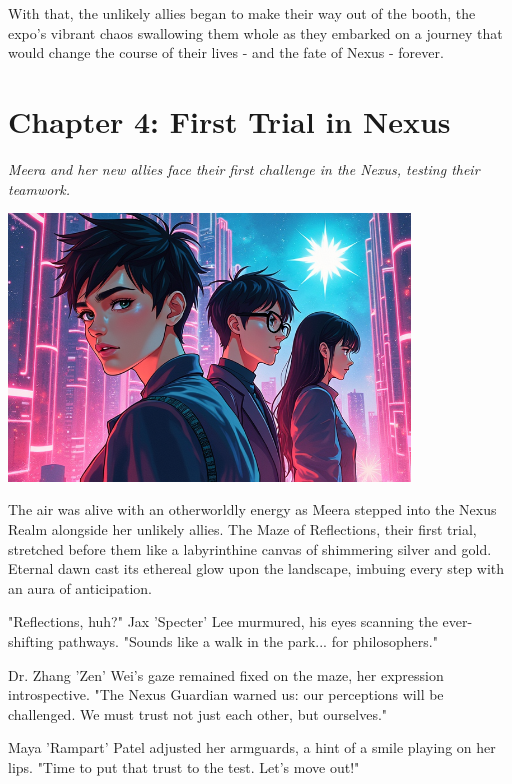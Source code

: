 \documentclass[12pt]{report}  %
\begin{document}
With that, the unlikely allies began to make their way out of the booth,
the expo's vibrant chaos swallowing them whole as they embarked on a
journey that would change the course of their lives - and the fate of
Nexus - forever.


\chapter*{Chapter 4: First Trial in Nexus}
\textit{Meera and her new allies face their first challenge in the Nexus, testing their teamwork.}

\begin{center}
\includegraphics[width=0.8\textwidth]{stories/my_story/step_6/scenes/nexus_challenge.live.png}
\end{center}

The air was alive with an otherworldly energy as Meera stepped into the
Nexus Realm alongside her unlikely allies. The Maze of Reflections,
their first trial, stretched before them like a labyrinthine canvas of
shimmering silver and gold. Eternal dawn cast its ethereal glow upon the
landscape, imbuing every step with an aura of anticipation.

"Reflections, huh?" Jax 'Specter' Lee murmured, his eyes scanning the
ever-shifting pathways. "Sounds like a walk in the park... for
philosophers."

Dr. Zhang 'Zen' Wei's gaze remained fixed on the maze, her expression
introspective. "The Nexus Guardian warned us: our perceptions will be
challenged. We must trust not just each other, but ourselves."

Maya 'Rampart' Patel adjusted her armguards, a hint of a smile playing
on her lips. "Time to put that trust to the test. Let's move out!"
\end{document}
